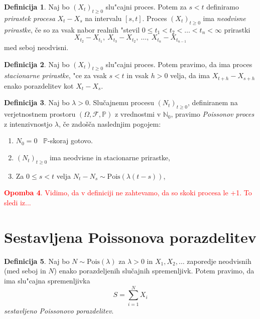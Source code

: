 \documentclass[12pt, a4paper, reqno]{amsart}
\theoremstyle{definition}
\newtheorem{definicija}{Definicija}[section]
\newtheorem{opomba}[definicija]{Opomba}
\theoremstyle{plain}
\newcommand{\N}{\mathbb{N}}
\newcommand{\Prob}{\mathbb{P}}
\newcommand{\1}{\mathds{1}}
\newcommand{\Pois}[1]{\text{Pois}(#1)}
\begin{document}
    \begin{definicija}
        Naj bo $(X_t)_{t\geq0}$ slu"cajni proces. Potem za $s < t$ definiramo
        \textit{prirastek procesa} $X_t - X_s$ na intervalu $[s, t]$. Proces $(X_t)_{t\geq0}$ ima 
        \textit{neodvisne prirastke}, če so za vsak nabor realnih "stevil
        $0 \leq t_1 < t_2 < \ldots < t_n < \infty$ prirastki
        $$
            X_{t_2} - X_{t_1}, \ X_{t_3} - X_{t_2}, \ \ldots, \ X_{t_n} - X_{t_{n-1}}
        $$
        med seboj neodvisni.
        \label{def:prirastek}
    \end{definicija}

    \begin{definicija}
        Naj bo $(X_t)_{t\geq0}$ slu"cajni proces. Potem pravimo, da ima proces
        \textit{stacionarne prirastke}, "ce za vsak $s < t$ in vsak $h > 0$ velja, 
        da ima $X_{t+h} - X_{s+h}$ enako porazdelitev kot $X_t - X_s$.
        \label{def:stacPrir}
    \end{definicija}

    \begin{definicija}
        Naj bo $\lambda > 0$. Slučajnemu procesu $(N_t)_{t\geq 0}$, definiranem na verjetnostnem 
        prostoru $(\Omega, \mathcal{F}, \mathbb{P})$ z vrednostmi v $\N_0$, pravimo 
        \textit{Poissonov proces} z intenzivnostjo $\lambda$, če zadošča naslednjim pogojem:
        \begin{enumerate}
            \item $N_0 = 0$ \ $\Prob$-skoraj gotovo.
            \item $(N_t)_{t\geq 0}$ ima neodvisne in stacionarne prirastke,
            \item Za $0 \leq s < t$ velja $ N_t - N_s \sim\Pois{\lambda(t - s)}$,
        \end{enumerate}
        \label{def:HPP}
    \end{definicija}
\textcolor{red}{
    \begin{opomba}
        Vidimo, da v definiciji ne zahtevamo, da so skoki procesa le +1. To sledi iz...
        \label{op:skoki}
    \end{opomba}
}

\section{Sestavljena Poissonova porazdelitev}

    \begin{definicija}
        Naj bo $N\sim \Pois{\lambda}$  za $\lambda >0$ in $X_1, X_2, \dots$ zaporedje neodvisnih (med seboj in $N$)
        enako porazdeljenih slučajnih spremenljivk. Potem pravimo, da ima slu"cajna spremenljivka
        \begin{equation*}
            S = \sum_{i=1}^NX_i
        \end{equation*}
        \textit{sestavljeno Poissonovo porazdelitev}. 
        \label{def:sestavljenaPoissonovaPorazdelitev}
    \end{definicija}
\end{document}
